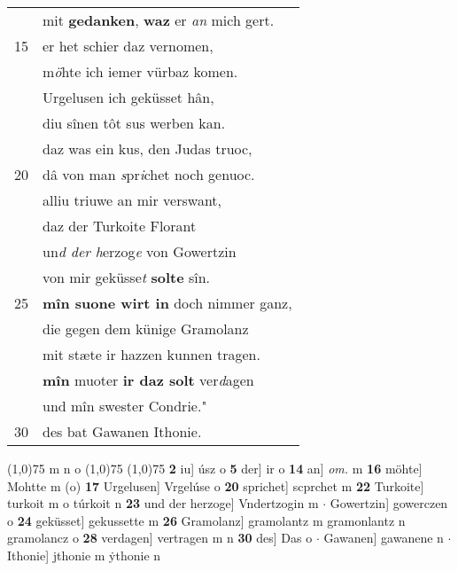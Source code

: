 \documentclass[8pt,a4paper,notitlepage]{article}
\begin{document}
\begin{table}[ht]
\begin{minipage}[t]{0.5\linewidth}
\begin{tabular}{rl}
 & mit \textbf{gedanken}, \textbf{waz} er \textit{an} mich gert.\\ 
15 & er het schier daz vernomen,\\ 
 & m\textit{ö}hte ich iemer vürbaz komen.\\ 
 & Urgelusen ich geküsset hân,\\ 
 & diu sînen tôt sus werben kan.\\ 
 & daz was ein kus, den Judas truoc,\\ 
20 & dâ von man \textit{s}pr\textit{i}chet noch genuoc.\\ 
 & alliu triuwe an mir verswant,\\ 
 & daz der Turkoite Florant\\ 
 & un\textit{d der h}erzog\textit{e} von Gowertzin\\ 
 & von mir geküsse\textit{t} \textbf{solte} sîn.\\ 
25 & \textbf{mîn suone wirt in} doch nimmer ganz,\\ 
 & die gegen dem künige Gramolanz\\ 
 & mit stæte ir hazzen kunnen tragen.\\ 
 & \textbf{mîn} muoter \textbf{ir daz solt} ver\textit{d}agen\\ 
 & und mîn swester Condrie."\\ 
30 & des bat Gawanen Ithonie.\\ 
\end{tabular}
\scriptsize
\line(1,0){75} \newline
m n o \newline
\line(1,0){75} \newline
\newline
\line(1,0){75} \newline
\textbf{2} iu] úsz o \textbf{5} der] ir o \textbf{14} an] \textit{om.} m \textbf{16} möhte] Mohtte m (o) \textbf{17} Urgelusen] Vrgelúse o \textbf{20} sprichet] scprchet m \textbf{22} Turkoite] turkoit m o túrkoit n \textbf{23} und der herzoge] Vndertzogin m  $\cdot$ Gowertzin] gowerczen o \textbf{24} geküsset] gekussette m \textbf{26} Gramolanz] gramolantz m gramonlantz n gramolancz o \textbf{28} verdagen] vertragen m n \textbf{30} des] Das o  $\cdot$ Gawanen] gawanene n  $\cdot$ Ithonie] jthonie m ẏthonie n \newline
\end{minipage}
\end{table}
\newpage
\end{document}
